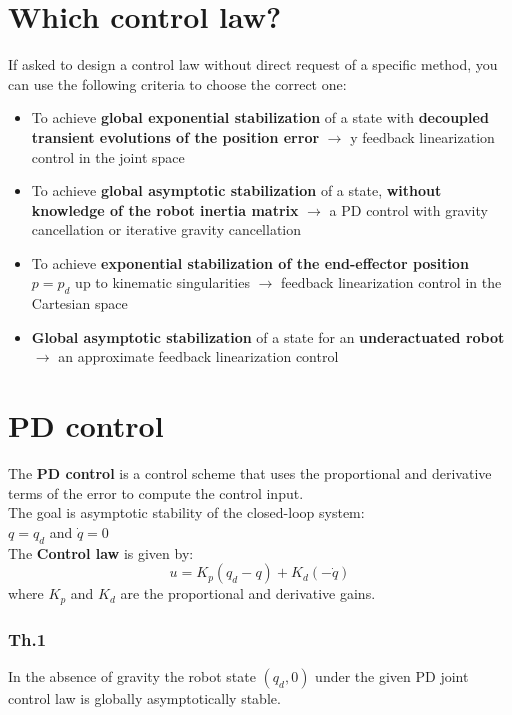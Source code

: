 \documentclass[a4paper,12pt]{article}
\begin{document}
\section{Which control law?}
If asked to design a control law without direct request of a specific method, you can use the following criteria
to choose the correct one:
\begin{itemize}
\item To achieve \textbf{global exponential stabilization} of 
a state with \textbf{decoupled transient evolutions
 of the position error} $\rightarrow$ y feedback linearization control in the joint space
 \item To achieve \textbf{global asymptotic stabilization} of a state, \textbf{without knowledge of the robot
 inertia matrix} $\rightarrow$ a PD control with gravity
 cancellation or iterative gravity cancellation
 \item To achieve \textbf{exponential stabilization of the end-effector
  position} $p=p_d$ up
 to kinematic singularities $\rightarrow$ feedback linearization
  control in the Cartesian space
  \item \textbf{Global asymptotic stabilization} of a state for an 
  \textbf{underactuated robot} $\rightarrow$ an approximate
   feedback linearization control
\end{itemize}





\section{PD control}
The \textbf{PD control} is a control scheme that uses the
proportional and derivative terms of the error to compute the
control input.\\
The goal is asymptotic stability of the closed-loop system:\\
$q=q_d$ and $\dot{q}=0$\\
The \textbf{Control law} is given by:
\begin{equation}
    u = K_p(q_d-q) + K_d(-\dot{q})
\end{equation}
where $K_p$ and $K_d$ are the proportional and derivative gains.\\
\subsubsection{Th.1}
In the absence of gravity the robot state $(q_d,0)$ under the given 
PD joint control law is globally asymptotically stable.
\end{document}
